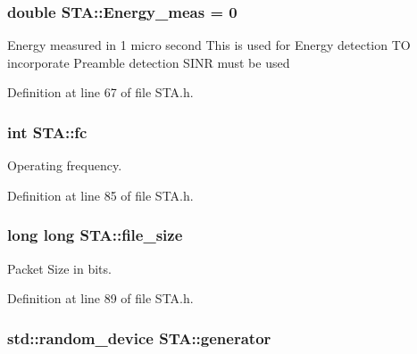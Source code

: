 \hypertarget{classSTA_a3d52251caf1e4b973bf795dcf8c2fafa}{
\subsubsection[{Energy\-\_\-meas}]{\setlength{\rightskip}{0pt plus 5cm}double S\-T\-A\-::\-Energy\-\_\-meas = 0\hspace{0.3cm}{\ttfamily [private]}}}\label{classSTA_a3d52251caf1e4b973bf795dcf8c2fafa}
Energy measured in 1 micro second This is used for Energy detection T\-O incorporate Preamble detection S\-I\-N\-R must be used 

Definition at line 67 of file S\-T\-A.\-h.

\hypertarget{classSTA_a07c54eac4b0f34790e0a2e4dcbe720ac}{
\subsubsection[{fc}]{\setlength{\rightskip}{0pt plus 5cm}int S\-T\-A\-::fc\hspace{0.3cm}{\ttfamily [private]}}}\label{classSTA_a07c54eac4b0f34790e0a2e4dcbe720ac}


Operating frequency. 



Definition at line 85 of file S\-T\-A.\-h.

\hypertarget{classSTA_acdf811c6a31773fa3d64ef07efa8941d}{
\subsubsection[{file\-\_\-size}]{\setlength{\rightskip}{0pt plus 5cm}long long S\-T\-A\-::file\-\_\-size\hspace{0.3cm}{\ttfamily [private]}}}\label{classSTA_acdf811c6a31773fa3d64ef07efa8941d}


Packet Size in bits. 



Definition at line 89 of file S\-T\-A.\-h.

\hypertarget{classSTA_a6abca7e07713d8123e843efea3c87cd1}{
\subsubsection[{generator}]{\setlength{\rightskip}{0pt plus 5cm}std\-::random\-\_\-device S\-T\-A\-::generator\hspace{0.3cm}{\ttfamily [private]}}}\label{classSTA_a6abca7e07713d8123e843efea3c87cd1}


